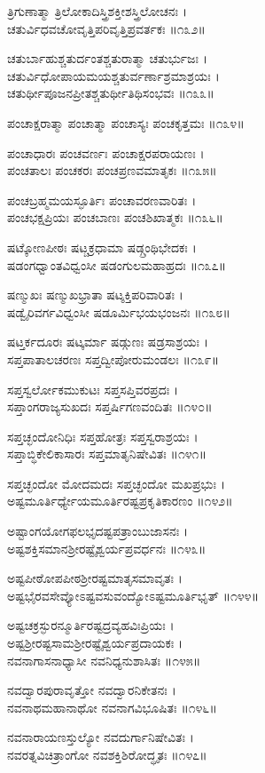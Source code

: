 ತ್ರಿಗುಣಾತ್ಮಾ ತ್ರಿಲೋಕಾದಿಸ್ತ್ರಿಶಕ್ತೀಶಸ್ತ್ರಿಲೋಚನಃ ।\\
ಚತುರ್ವಿಧವಚೋವೃತ್ತಿಪರಿವೃತ್ತಿಪ್ರವರ್ತಕಃ ॥೧೩೨॥

ಚತುರ್ಬಾಹುಶ್ಚತುರ್ದಂತಶ್ಚತುರಾತ್ಮಾ ಚತುರ್ಭುಜಃ ।\\
ಚತುರ್ವಿಧೋಪಾಯಮಯಶ್ಚತುರ್ವರ್ಣಾಶ್ರಮಾಶ್ರಯಃ ।\\
ಚತುರ್ಥೀಪೂಜನಪ್ರೀತಶ್ಚತುರ್ಥೀತಿಥಿಸಂಭವಃ ॥೧೩೩॥

ಪಂಚಾಕ್ಷರಾತ್ಮಾ ಪಂಚಾತ್ಮಾ ಪಂಚಾಸ್ಯಃ ಪಂಚಕೃತ್ತಮಃ ॥೧೩೪॥

ಪಂಚಾಧಾರಃ ಪಂಚವರ್ಣಃ ಪಂಚಾಕ್ಷರಪರಾಯಣಃ ।\\
ಪಂಚತಾಲಃ ಪಂಚಕರಃ ಪಂಚಪ್ರಣವಮಾತೃಕಃ ॥೧೩೫॥

ಪಂಚಬ್ರಹ್ಮಮಯಸ್ಫೂರ್ತಿಃ ಪಂಚಾವರಣವಾರಿತಃ ।\\
ಪಂಚಭಕ್ಷಪ್ರಿಯಃ ಪಂಚಬಾಣಃ ಪಂಚಶಿಖಾತ್ಮಕಃ ॥೧೩೬॥

ಷಟ್ಕೋಣಪೀಠಃ ಷಟ್ಚಕ್ರಧಾಮಾ ಷಡ್ಗ್ರಂಥಿಭೇದಕಃ ।\\
ಷಡಂಗಧ್ವಾಂತವಿಧ್ವಂಸೀ ಷಡಂಗುಲಮಹಾಹ್ರದಃ ॥೧೩೭॥

ಷಣ್ಮುಖಃ ಷಣ್ಮುಖಭ್ರಾತಾ ಷಟ್ಶಕ್ತಿಪರಿವಾರಿತಃ ।\\
ಷಡ್ವೈರಿವರ್ಗವಿಧ್ವಂಸೀ ಷಡೂರ್ಮಿಭಯಭಂಜನಃ ॥೧೩೮॥

ಷಟ್ತರ್ಕದೂರಃ ಷಟ್ಕರ್ಮಾ ಷಡ್ಗುಣಃ ಷಡ್ರಸಾಶ್ರಯಃ ।\\
ಸಪ್ತಪಾತಾಲಚರಣಃ ಸಪ್ತದ್ವೀಪೋರುಮಂಡಲಃ ॥೧೩೯॥

ಸಪ್ತಸ್ವರ್ಲೋಕಮುಕುಟಃ ಸಪ್ತಸಪ್ತಿವರಪ್ರದಃ ।\\
ಸಪ್ತಾಂಗರಾಜ್ಯಸುಖದಃ ಸಪ್ತರ್ಷಿಗಣವಂದಿತಃ ॥೧೪೦॥

ಸಪ್ತಚ್ಛಂದೋನಿಧಿಃ ಸಪ್ತಹೋತ್ರಃ ಸಪ್ತಸ್ವರಾಶ್ರಯಃ ।\\
ಸಪ್ತಾಬ್ಧಿಕೇಲಿಕಾಸಾರಃ ಸಪ್ತಮಾತೃನಿಷೇವಿತಃ ॥೧೪೧॥

ಸಪ್ತಚ್ಛಂದೋ ಮೋದಮದಃ ಸಪ್ತಚ್ಛಂದೋ ಮಖಪ್ರಭುಃ ।\\
ಅಷ್ಟಮೂರ್ತಿರ್ಧ್ಯೇಯಮೂರ್ತಿರಷ್ಟಪ್ರಕೃತಿಕಾರಣಂ ॥೧೪೨॥

ಅಷ್ಟಾಂಗಯೋಗಫಲಭೃದಷ್ಟಪತ್ರಾಂಬುಜಾಸನಃ ।\\
ಅಷ್ಟಶಕ್ತಿಸಮಾನಶ್ರೀರಷ್ಟೈಶ್ವರ್ಯಪ್ರವರ್ಧನಃ ॥೧೪೩॥

ಅಷ್ಟಪೀಠೋಪಪೀಠಶ್ರೀರಷ್ಟಮಾತೃಸಮಾವೃತಃ ।\\
ಅಷ್ಟಭೈರವಸೇವ್ಯೋಽಷ್ಟವಸುವಂದ್ಯೋಽಷ್ಟಮೂರ್ತಿಭೃತ್ ॥೧೪೪॥

ಅಷ್ಟಚಕ್ರಸ್ಫುರನ್ಮೂರ್ತಿರಷ್ಟದ್ರವ್ಯಹವಿಃಪ್ರಿಯಃ ।\\
ಅಷ್ಟಶ್ರೀರಷ್ಟಸಾಮಶ್ರೀರಷ್ಟೈಶ್ವರ್ಯಪ್ರದಾಯಕಃ ।\\
ನವನಾಗಾಸನಾಧ್ಯಾಸೀ ನವನಿಧ್ಯನುಶಾಸಿತಃ ॥೧೪೫॥

ನವದ್ವಾರಪುರಾವೃತ್ತೋ ನವದ್ವಾರನಿಕೇತನಃ ।\\
ನವನಾಥಮಹಾನಾಥೋ ನವನಾಗವಿಭೂಷಿತಃ ॥೧೪೬॥

ನವನಾರಾಯಣಸ್ತುಲ್ಯೋ ನವದುರ್ಗಾನಿಷೇವಿತಃ ।\\
ನವರತ್ನವಿಚಿತ್ರಾಂಗೋ ನವಶಕ್ತಿಶಿರೋದ್ಧೃತಃ ॥೧೪೭॥


